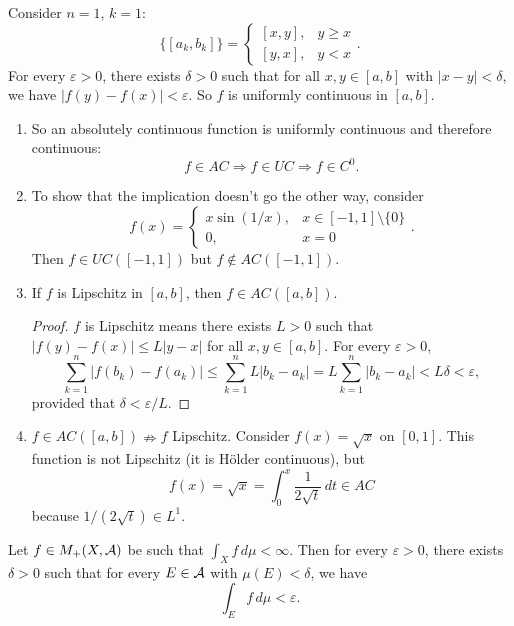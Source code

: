 \begin{remark}
Consider $n = 1$, $k = 1$:
\[
\{[a_k, b_k]\} = 
\begin{cases}
[x,y], & y \geq x \\
[y,x], & y < x
\end{cases}.
\]
For every $\varepsilon > 0$, there exists $\delta > 0$ such that for all $x, y \in [a,b]$ with $|x - y| < \delta$, we have $|f(y) - f(x)| < \varepsilon$. So $f$ is uniformly continuous in $[a,b]$.

\begin{enumerate}
\item So an absolutely continuous function is uniformly continuous and therefore continuous:
\[
f \in AC \Rightarrow f \in UC \Rightarrow f \in C^0.
\]

\item To show that the implication doesn't go the other way, consider
\[
f(x) = 
\begin{cases}
x \sin(1/x), & x \in [-1,1] \setminus \{0\} \\
0, & x = 0
\end{cases}.
\]
Then $f \in UC([-1,1])$ but $f \notin AC([-1,1])$.

\item If $f$ is Lipschitz in $[a,b]$, then $f \in AC([a,b])$.

\begin{proof}
$f$ is Lipschitz means there exists $L > 0$ such that $|f(y) - f(x)| \leq L|y - x|$ for all $x, y \in [a,b]$. For every $\varepsilon > 0$,
\[
\sum_{k=1}^n |f(b_k) - f(a_k)| \leq \sum_{k=1}^n L|b_k - a_k| = L \sum_{k=1}^n |b_k - a_k| < L\delta < \varepsilon,
\]
provided that $\delta < \varepsilon/L$.
\end{proof}

\item $f \in AC([a,b]) \nRightarrow f$ Lipschitz. Consider $f(x) = \sqrt{x}$ on $[0,1]$. This function is not Lipschitz (it is Hölder continuous), but
\[
f(x) = \sqrt{x} = \int_0^x \frac{1}{2\sqrt{t}} \, dt \in AC
\]
because $1/(2\sqrt{t}) \in L^1$.
\end{enumerate}
\end{remark}

\begin{theorem}
Let $f \in M_+(X, \mathcal{A})$ be such that $\int_X f \, d\mu < \infty$. Then for every $\varepsilon > 0$, there exists $\delta > 0$ such that for every $E \in \mathcal{A}$ with $\mu(E) < \delta$, we have
\[
\int_E f \, d\mu < \varepsilon.
\]
\end{theorem}

